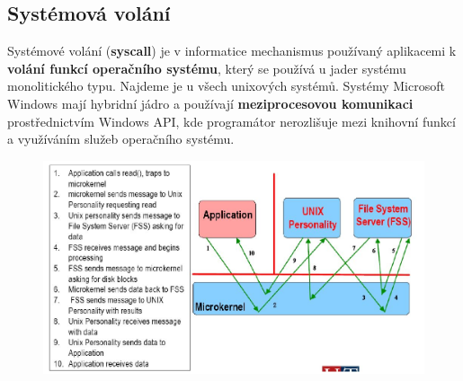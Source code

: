 \subsection{Systémová volání}
Systémové volání (\textbf{syscall}) je v informatice mechanismus používaný aplikacemi k \textbf{volání funkcí operačního systému}, který se používá u jader systému monolitického typu. Najdeme je u všech unixových systémů. Systémy Microsoft Windows mají hybridní jádro a používají \textbf{meziprocesovou komunikaci} prostřednictvím Windows API, kde programátor nerozlišuje mezi knihovní funkcí a využíváním služeb operačního systému.

\begin{figure}[H]
\centering
\includegraphics[width=1\textwidth]{assets/3_sys_call}
\end{figure}